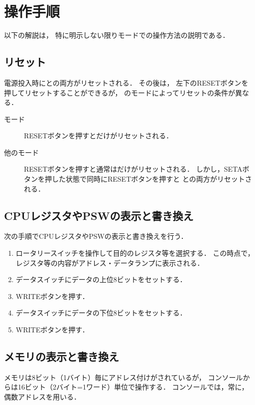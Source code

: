 \section{操作手順}

以下の解説は，
特に明示しない限り{\tac}モードでの操作方法の説明である．

\subsection{リセット}
電源投入時に{\tec}と{\tac}の両方がリセットされる．
その後は，
左下のRESETボタンを押してリセットすることができるが，
{\tecS}のモードによってリセットの条件が異なる．

\begin{description}
\item[{\tac}モード]
  RESETボタンを押すと{\tac}だけがリセットされる．
\item[他のモード]
  RESETボタンを押すと通常は{\tec}だけがリセットされる．
  しかし，SETAボタンを押した状態で同時にRESETボタンを押すと
  {\tec}と{\tac}の両方がリセットされる．
\end{description}

\subsection{CPUレジスタやPSWの表示と書き換え}
次の手順でCPUレジスタやPSWの表示と書き換えを行う．

\begin{enumerate}
\item ロータリースイッチを操作して目的のレジスタ等を選択する．
  この時点で，レジスタ等の内容がアドレス・データランプに表示される．
\item データスイッチにデータの上位8ビットをセットする．
\item WRITEボタンを押す．
\item データスイッチにデータの下位8ビットをセットする．
\item WRITEボタンを押す．
\end{enumerate}

\subsection{メモリの表示と書き換え}
メモリは8ビット（1バイト）毎にアドレス付けがされているが，
コンソールからは16ビット（2バイト=1ワード）単位で操作する．
コンソールでは，常に，偶数アドレスを用いる．

